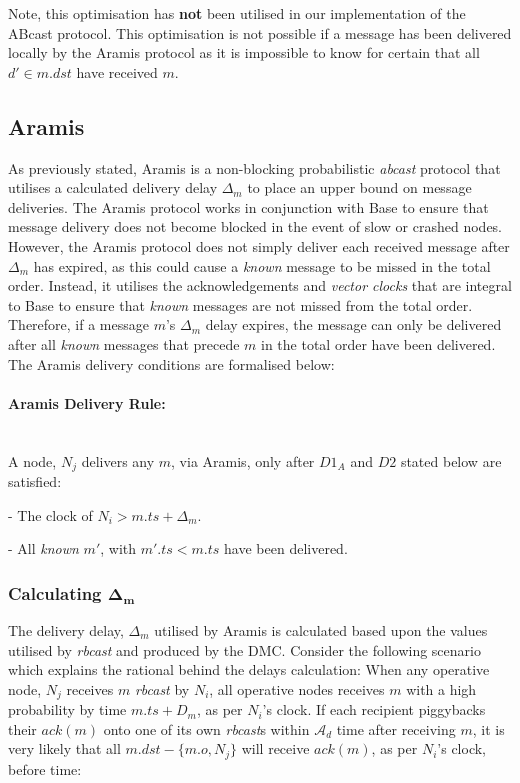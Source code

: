     Note, this optimisation has \textbf{not} been utilised in our implementation of the \textsf{ABcast} protocol.  This optimisation is not possible if a message has been delivered locally by the \textsf{Aramis} protocol as it is impossible to know for certain that all $d' \in m.dst$ have received $m$.  

    \subsection{Aramis}
    As previously stated,  \textsf{Aramis} is a non-blocking probabilistic \emph{abcast} protocol that utilises a calculated delivery delay $\Delta_m$ to place an upper bound on message deliveries.  The \textsf{Aramis} protocol works in conjunction with \textsf{Base} to ensure that message delivery does not become blocked in the event of slow or crashed nodes.  However, the \textsf{Aramis} protocol does not simply deliver each received message after $\Delta_m$ has expired, as this could cause a \emph{known} message to be missed in the total order.  Instead, it utilises the acknowledgements and \emph{vector clocks} that are integral to \textsf{Base} to ensure that \emph{known} messages are not missed from the total order.  Therefore, if a message $m$'s $\Delta_m$ delay expires, the message can only be delivered after all \emph{known} messages that precede $m$ in the total order have been delivered.  The \textsf{Aramis} delivery conditions are formalised below:
    
    \paragraph{\textsf{Aramis} Delivery Rule:}\hspace{0pt} \\
	    A node, $N_j$ delivers any $m$, via \textsf{Aramis}, only after $D1_A$ and $D2$ stated below are satisfied:
	    \begin{description}[labelindent=1cm]
	        \item[$\boldsymbol{D1_A}$] - The clock of $N_i > m.ts + \Delta_{m}$. 
	        \item[$\boldsymbol{D2}$] - All \emph{known} $m'$, with $m'.ts < m.ts$ have been delivered.
	    \end{description}
    
    
        \subsubsection*{Calculating $\boldsymbol{\Delta_m}$    }
		The delivery delay, $\Delta_m$ utilised by \textsf{Aramis} is calculated based upon the values utilised by \emph{rbcast} and produced by the DMC.  Consider the following scenario which explains the rational behind the delays calculation: When any operative node, $N_j$ receives $m$ \emph{rbcast} by $N_i$, all operative nodes receives $m$ with a high probability by time $m.ts + D_m$, as per $N_i$'s clock.  If each recipient piggybacks their $ack(m)$ onto one of its own \emph{rbcast}s within $\mathcal{A}_d$ time after receiving $m$, it is very likely that all $m.dst - \{m.o, N_j\}$ will receive $ack(m)$, as per $N_i$'s clock, before time:
		
